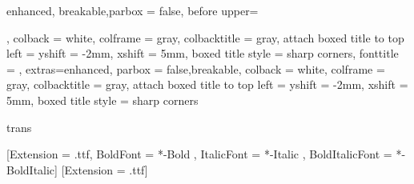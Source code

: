 {enhanced, breakable,parbox = false, before upper={\par},
    colback = white, colframe = gray, colbacktitle = gray,
    attach boxed title to top left = {yshift = -2mm, xshift = 5mm},
    boxed title style = {sharp corners},
    fonttitle = \sffamily, extras={enhanced, parbox = false,breakable,
            colback = white, colframe = gray, colbacktitle = gray,
            attach boxed title to top left = {yshift = -2mm, xshift = 5mm},
            boxed title style = {sharp corners}}}{trans}

[Extension = .ttf,
    BoldFont = *-Bold ,
    ItalicFont = *-Italic ,
    BoldItalicFont = *-BoldItalic]
[Extension = .ttf]

\newcommand\nwithdescender{{\medieval }}
\newcommand\Eunical{{\medieval }}
\newcommand\Eclosedunical{{\medieval }}
\newcommand\vbart{{\normalfont \textvbaraccent{\medieval ꞇ}}}

\newcommand{\nom}{\textsc{n}}
\newcommand{\gen}{\textsc{g}}
\newcommand{\dat}{\textsc{d}}
\newcommand{\acc}{\textsc{a}}
\newcommand{\mas}{\textsc{m}}
\newcommand{\neu}{\textsc{neu}}
\newcommand{\fem}{\textsc{f}}
\newcommand{\pl}{\textsc{p}}
\newcommand{\sing}{\textsc{s}}
\newcommand{\sub}{\textsc{sub}}
\newcommand{\DEF}{\textsc{def}}

\makeatletter
{}
\makeatletter

